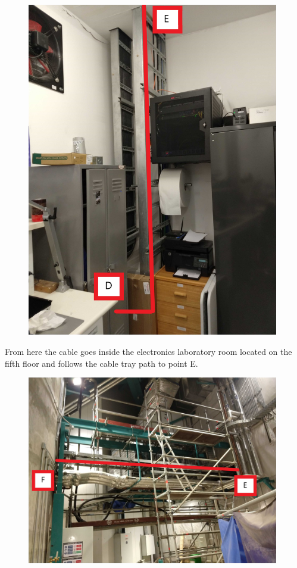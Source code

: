 \begin{figure}
  \includegraphics[width=11cm]{images/17.jpg}
  \centering
  \label{fig:jlsimon}
\end{figure}

From here the cable goes inside the electronics laboratory room located on the fifth floor and follows the cable tray path to point E.

\begin{figure}
  \includegraphics[width=11cm]{images/18.jpg}
  \centering
  \label{fig:jlsimon}
\end{figure}

